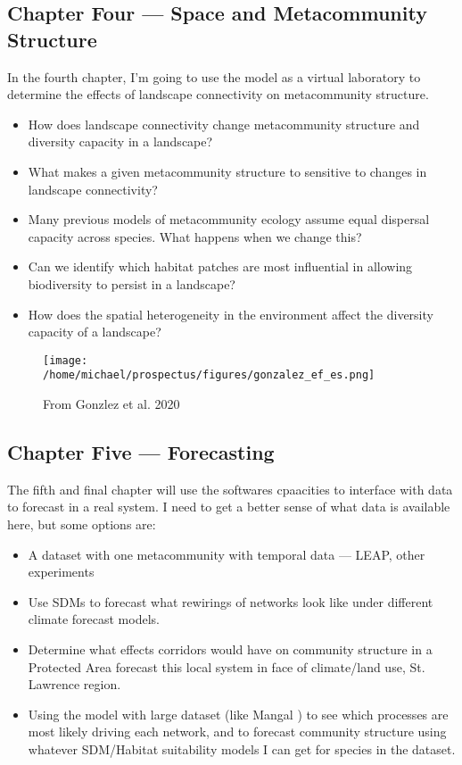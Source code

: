 \documentclass[]{article}
\begin{document}
\subsection*{Chapter Four --- Space and Metacommunity Structure}
In the fourth chapter, I'm going to use the model as a virtual laboratory to determine the effects of landscape connectivity on metacommunity structure.

\begin{itemize}
    \item How does landscape connectivity change metacommunity structure and diversity capacity in a landscape?
    \item What makes a given metacommunity structure to sensitive to changes in landscape connectivity?
    \item Many previous models of metacommunity ecology assume equal dispersal capacity across species. What happens when we change this?
    \item Can we identify which habitat patches are most influential in allowing biodiversity to persist in a landscape?
    \item How does the spatial heterogeneity in the environment affect the diversity capacity of a landscape?
\end{itemize}
\begin{figure}[H]
\centering
\texttt{[image: /home/michael/prospectus/figures/gonzalez\_ef\_es.png]}
\caption{From Gonzlez et al. 2020 \cite{gonzalez_scaling-up_2020}} \label{fig:gonzalez2020}
\end{figure}

\subsection*{Chapter Five --- Forecasting }

The fifth and final chapter will use the softwares cpaacities to interface with data to forecast in a real system. I need to get a better sense of what data is available here, but some options are:
\begin{itemize}
    \item A dataset with one metacommunity with temporal data --- LEAP, other experiments
    \item Use SDMs to forecast what rewirings of networks look like under different climate forecast models.
    \item Determine what effects corridors would have on community structure in a Protected Area
    forecast this local system in face of climate/land use, St. Lawrence region.
    \item Using the model with large dataset (like Mangal \cite{vissault_mangal_2019}) to see which processes are most likely driving each network, and to forecast community structure using whatever SDM/Habitat suitability models I can get for species in the dataset.
\end{itemize}
\end{document}
